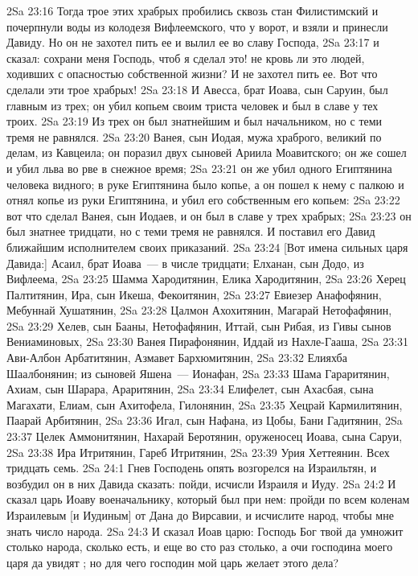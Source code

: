 \vs 2Sa 23:16 Тогда трое этих храбрых пробились сквозь стан Филистимский и почерпнули воды из колодезя Вифлеемского, что у ворот, и взяли и принесли Давиду. Но он не захотел пить ее и вылил ее во славу Господа,
\vs 2Sa 23:17 и сказал: сохрани меня Господь, чтоб я сделал это! не кровь ли это людей, ходивших с опасностью собственной жизни? И не захотел пить ее. Вот что сделали эти трое храбрых!
\vs 2Sa 23:18 И Авесса, брат Иоава, сын Саруин, был главным из трех; он убил копьем своим триста человек и был в славе у тех троих.
\vs 2Sa 23:19 Из трех он был знатнейшим и был начальником, но с теми тремя не равнялся.
\vs 2Sa 23:20 Ванея, сын Иодая, мужа храброго, великий по делам, из Кавцеила; он поразил двух сыновей Ариила Моавитского; он же сошел и убил льва во рве в снежное время;
\vs 2Sa 23:21 он же убил одного Египтянина человека видного; в руке Египтянина было копье, а он пошел к нему с палкою и отнял копье из руки Египтянина, и убил его собственным его копьем:
\vs 2Sa 23:22 вот что сделал Ванея, сын Иодаев, и он был в славе у трех храбрых;
\vs 2Sa 23:23 он был знатнее тридцати, но с теми тремя не равнялся. И поставил его Давид ближайшим исполнителем своих приказаний.
\rsbpar\vs 2Sa 23:24 [Вот имена сильных царя Давида:] Асаил, брат Иоава~--- в числе тридцати; Елханан, сын Додо, из Вифлеема,
\vs 2Sa 23:25 Шамма Хародитянин, Елика Хародитянин,
\vs 2Sa 23:26 Херец Палтитянин, Ира, сын Икеша, Фекоитянин,
\vs 2Sa 23:27 Евиезер Анафофянин, Мебуннай Хушатянин,
\vs 2Sa 23:28 Цалмон Ахохитянин, Магарай Нетофафянин,
\vs 2Sa 23:29 Хелев, сын Бааны, Нетофафянин, Иттай, сын Рибая, из Гивы сынов Вениаминовых,
\vs 2Sa 23:30 Ванея Пирафонянин, Иддай из Нахле-Гааша,
\vs 2Sa 23:31 Ави-Албон Арбатитянин, Азмавет Бархюмитянин,
\vs 2Sa 23:32 Елияхба Шаалбонянин; из сыновей Яшена~--- Ионафан,
\vs 2Sa 23:33 Шама Гараритянин, Ахиам, сын Шарара, Араритянин,
\vs 2Sa 23:34 Елифелет, сын Ахасбая, сына Магахати, Елиам, сын Ахитофела, Гилонянин,
\vs 2Sa 23:35 Хецрай Кармилитянин, Паарай Арбитянин,
\vs 2Sa 23:36 Игал, сын Нафана, из Цобы, Бани Гадитянин,
\vs 2Sa 23:37 Целек Аммонитянин, Нахарай Беротянин, оруженосец Иоава, сына Саруи,
\vs 2Sa 23:38 Ира Итритянин, Гареб Итритянин,
\vs 2Sa 23:39 Урия Хеттеянин. Всех тридцать семь.
\vs 2Sa 24:1 Гнев Господень опять возгорелся на Израильтян, и возбудил он в них Давида сказать: пойди, исчисли Израиля и Иуду.
\vs 2Sa 24:2 И сказал царь Иоаву военачальнику, который был при нем: пройди по всем коленам Израилевым [и Иудиным] от Дана до Вирсавии, и исчислите народ, чтобы мне знать число народа.
\vs 2Sa 24:3 И сказал Иоав царю: Господь Бог твой да умножит столько народа, сколько есть, и еще во сто раз столько, а очи господина моего царя да увидят ; но для чего господин мой царь желает этого дела?

